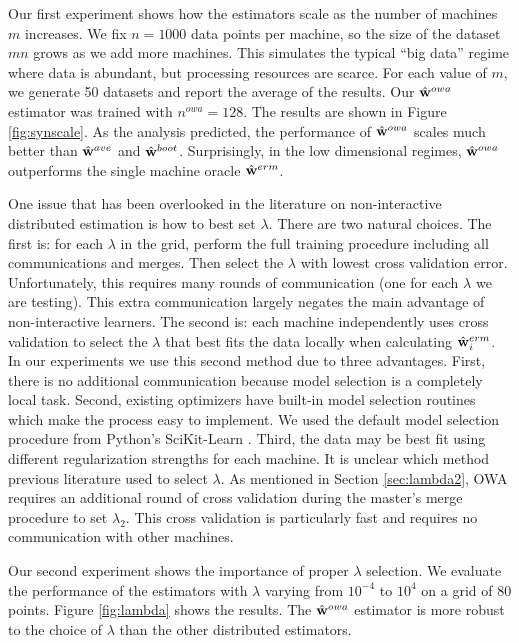 \documentclass[thesis.tex]{subfiles}
\newcommand{\nowa}{n^{\textit{owa}}}
\begin{document}
Our first experiment shows how the estimators scale as the number of machines $m$ increases.
We fix $n=1000$ data points per machine,
so the size of the dataset $mn$ grows as we add more machines.
This simulates the typical ``big data'' regime where data is abundant,
but processing resources are scarce.
For each value of $m$, we generate 50 datasets and report the average of the results.
Our $\hat{\mathbf w}^{owa}$ estimator was trained with $\nowa=128$.
The results are shown in Figure \ref{fig:synscale}.
As the analysis predicted, the performance of $\hat{\mathbf w}^{owa}$ scales much better than $\hat{\mathbf w}^{ave}$ and $\hat{\mathbf w}^{boot}$.
Surprisingly, in the low dimensional regimes, $\hat{\mathbf w}^{owa}$ outperforms the single machine oracle $\hat{\mathbf w}^{erm}$.

One issue that has been overlooked in the literature on non-interactive distributed estimation is how to best set $\lambda$.
There are two natural choices. %
The first is: for each $\lambda$ in the grid, perform the full training procedure including all communications and merges.
Then select the $\lambda$ with lowest cross validation error.
Unfortunately, this requires many rounds of communication (one for each $\lambda$ we are testing).
This extra communication largely negates the main advantage of non-interactive learners.
The second is: each machine independently uses cross validation to select the $\lambda$ that best fits the data locally when calculating $\hat{\mathbf w}^{erm}_i$.
In our experiments we use this second method due to three advantages.
First, there is no additional communication because model selection is a completely local task.
Second, existing optimizers have built-in model selection routines which make the process easy to implement.
We used the default model selection procedure from Python's SciKit-Learn \citep{scikit-learn}.
Third, the data may be best fit using different regularization strengths for each machine.
It is unclear which method previous literature used to select $\lambda$.
As mentioned in Section \ref{sec:lambda2}, OWA requires an additional round of cross validation during the master's merge procedure to set $\lambda_2$.
This cross validation is particularly fast and requires no communication with other machines.

Our second experiment shows the importance of proper $\lambda$ selection.
We evaluate the performance of the estimators with $\lambda$ varying from $10^{-4}$ to $10^4$ on a grid of 80 points.
Figure \ref{fig:lambda} shows the results. 
The $\hat{\mathbf w}^{owa}$ estimator is more robust to the choice of $\lambda$ than the other distributed estimators.
\end{document}
